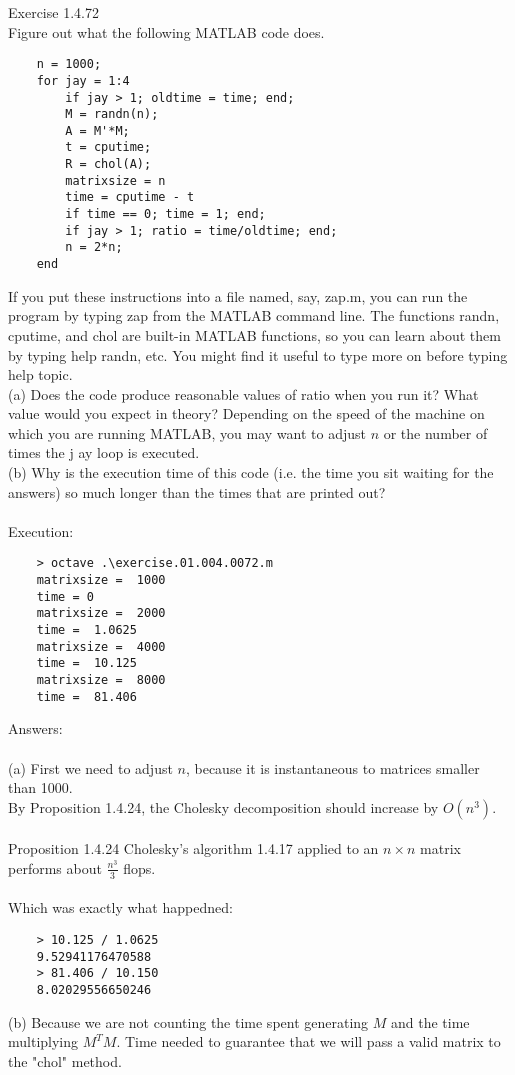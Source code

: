 \documentclass{article}
\begin{document}
	Exercise 1.4.72\\
	Figure out what the following MATLAB code does. 
	\begin{verbatim}
	n = 1000; 
	for jay = 1:4 
		if jay > 1; oldtime = time; end;
		M = randn(n); 
		A = M'*M; 
		t = cputime; 
		R = chol(A); 
		matrixsize = n
		time = cputime - t
		if time == 0; time = 1; end;
		if jay > 1; ratio = time/oldtime; end;
		n = 2*n; 
	end 	
	\end{verbatim}		
	If you put these instructions into a file named, say, zap.m, you can run the program by 
	typing zap from the MATLAB command line. The functions randn, cputime, 
	and chol are built-in MATLAB functions, so you can learn about them by typing 
	help randn, etc. You might find it useful to type more on before typing help 
	{topic}.\\ 
	(a) Does the code produce reasonable values of ratio when you run it? What 
	value would you expect in theory? Depending on the speed of the machine on 
	which you are running MATLAB, you may want to adjust $n$ or the number of 
	times the j ay loop is executed.\\ 
	(b) Why is the execution time of this code (i.e. the time you sit waiting for the 
	answers) so much longer than the times that are printed out?\\ 
	\\
	Execution:
	\begin{verbatim}
	> octave .\exercise.01.004.0072.m
	matrixsize =  1000
	time = 0
	matrixsize =  2000
	time =  1.0625
	matrixsize =  4000
	time =  10.125
	matrixsize =  8000
	time =  81.406
	\end{verbatim}
	Answers:\\
	\\
	(a) First we need to adjust $n$, because it is instantaneous to matrices smaller than 1000.\\
	By Proposition 1.4.24, the Cholesky decomposition should increase by $O(n^3)$.\\
	\\
	Proposition 1.4.24 Cholesky's algorithm 1.4.17 applied to an $n \times n$ matrix performs about $\frac{n^3}{3}$ flops.\\ 
	\\
	Which was exactly what happedned:\\
	\begin{verbatim}
	> 10.125 / 1.0625
	9.52941176470588
	> 81.406 / 10.150
	8.02029556650246
	\end{verbatim}
	(b) Because we are not counting the time spent generating $M$ and the time multiplying $M^TM$. Time needed to guarantee that we will pass a valid matrix to the "chol" method.
\end{document}
